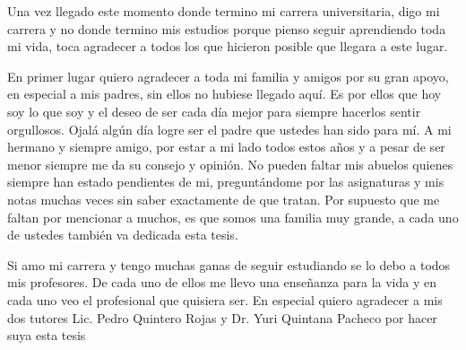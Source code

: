 \begin{acknowledgements}

Una vez llegado este momento donde termino mi carrera universitaria, digo mi carrera y no donde termino mis estudios porque pienso seguir aprendiendo toda mi vida, toca agradecer a todos los que hicieron posible que llegara a este lugar.

En primer lugar quiero agradecer a toda mi familia y amigos por su gran apoyo, en especial a mis padres, sin ellos no hubiese llegado aqu\'i. Es por ellos que hoy soy lo que soy y el deseo de ser cada d\'ia mejor para siempre hacerlos sentir orgullosos. Ojal\'a alg\'un d\'ia logre ser el padre que ustedes han sido para m\'i. A mi hermano y siempre amigo, por estar a mi lado todos estos a\~nos y a pesar de ser menor siempre me da su consejo y opini\'on. No pueden faltar mis abuelos quienes siempre han estado pendientes de mi, pregunt\'andome por las asignaturas y mis notas muchas veces sin saber exactamente de que tratan. Por supuesto que me faltan por mencionar a muchos, es que somos una familia muy grande, a cada uno de ustedes tambi\'en va dedicada esta tesis.

Si amo mi carrera y tengo muchas ganas de seguir estudiando se lo debo a todos mis profesores. De cada uno de ellos me llevo una ense\~nanza para la vida y en cada uno veo el profesional que quisiera ser. En especial quiero agradecer a mis dos tutores Lic. Pedro Quintero Rojas y Dr. Yuri Quintana Pacheco por hacer suya esta tesis

\end{acknowledgements}